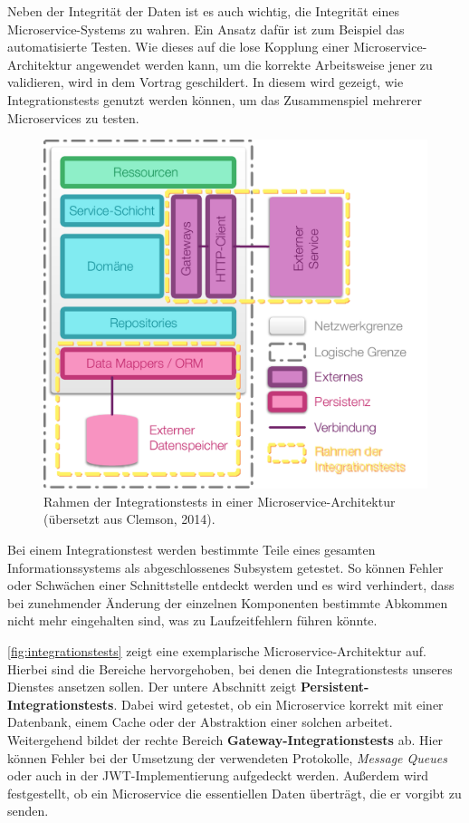 Neben der Integrität der Daten ist es auch wichtig, die Integrität eines Microservice-Systems zu wahren. Ein Ansatz dafür ist zum Beispiel das automatisierte Testen. Wie dieses auf die lose Kopplung einer Microservice-Architektur angewendet werden kann, um die korrekte Arbeitsweise jener zu validieren, wird in dem Vortrag \cite{Clemson14} geschildert. In diesem wird gezeigt, wie Integrationstests genutzt werden können, um das Zusammenspiel mehrerer Microservices zu testen.

\begin{figure}[h]
	\centering
	\includegraphics[width=.53\linewidth]{img/inte}
	\caption{Rahmen der Integrationstests in einer Microservice-Architektur (übersetzt aus Clemson, 2014).}
	\label{fig:integrationstests}
\end{figure}

Bei einem Integrationstest werden bestimmte Teile eines gesamten Informationssystems als abgeschlossenes Subsystem getestet. So können Fehler oder Schwächen einer Schnittstelle entdeckt werden und es wird verhindert, dass bei zunehmender Änderung der einzelnen Komponenten bestimmte Abkommen nicht mehr eingehalten sind, was zu Laufzeitfehlern führen könnte.

\autoref{fig:integrationstests} zeigt eine exemplarische Microservice-Architektur auf. Hierbei sind die Bereiche hervorgehoben, bei denen die Integrationstests unseres Dienstes ansetzen sollen. Der untere Abschnitt zeigt \textbf{Persistent-Integrationstests}. Dabei wird getestet, ob ein Microservice korrekt mit einer Datenbank, einem Cache oder der Abstraktion einer solchen arbeitet. Weitergehend bildet der rechte Bereich \textbf{Gateway-Integrationstests} ab. Hier können Fehler bei der Umsetzung der verwendeten Protokolle, \textit{Message Queues} oder auch in der JWT-Implementierung aufgedeckt werden. Außerdem wird festgestellt, ob ein Microservice die essentiellen Daten überträgt, die er vorgibt zu senden.

